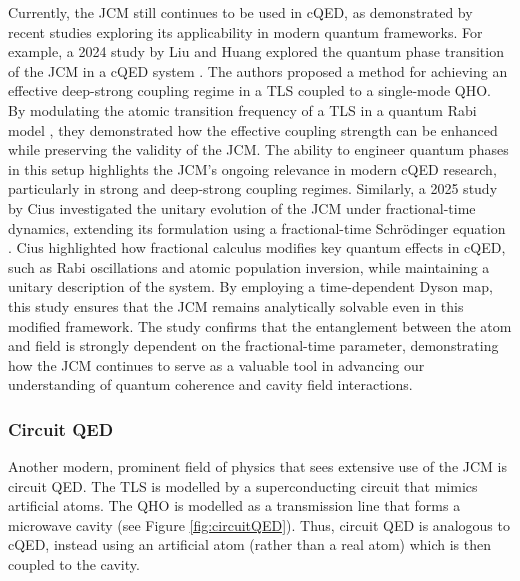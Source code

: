 \documentclass[12pt,a4paper]{article}
\begin{document}
Currently, the JCM still continues to be used in cQED, as demonstrated by recent studies exploring its applicability in modern quantum frameworks. For example, a 2024 study by Liu and Huang explored the quantum phase transition of the JCM in a cQED system \cite{Context2024-CQED_JCM}. The authors proposed a method for achieving an effective deep-strong coupling regime in a TLS coupled to a single-mode QHO. By modulating the atomic transition frequency of a TLS in a quantum Rabi model \cite{Context1936-Rabi}, they demonstrated how the effective coupling strength can be enhanced while preserving the validity of the JCM. The ability to engineer quantum phases in this setup highlights the JCM’s ongoing relevance in modern cQED research, particularly in strong and deep-strong coupling regimes. Similarly, a 2025 study by Cius investigated the unitary evolution of the JCM under fractional-time dynamics, extending its formulation using a fractional-time Schrödinger equation \cite{Context2025-CQED_JCM}. Cius highlighted how fractional calculus modifies key quantum effects in cQED, such as Rabi oscillations and atomic population inversion, while maintaining a unitary description of the system. By employing a time-dependent Dyson map, this study ensures that the JCM remains analytically solvable even in this modified framework. The study confirms that the entanglement between the atom and field is strongly dependent on the fractional-time parameter, demonstrating how the JCM continues to serve as a valuable tool in advancing our understanding of quantum coherence and cavity field interactions.

\subsubsection{Circuit QED}

Another modern, prominent field of physics that sees extensive use of the JCM is circuit QED. The TLS is modelled by a superconducting circuit that mimics artificial atoms. The QHO is modelled as a transmission line that forms a microwave cavity (see Figure \ref{fig:circuitQED}). Thus, circuit QED is analogous to cQED, instead using an artificial atom  (rather than a real atom) which is then coupled to the cavity. \\
\\
\end{document}
